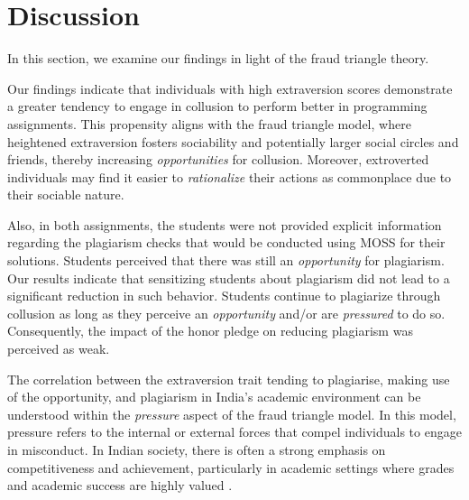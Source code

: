 \section{Discussion} \label{sec:discuss}

In this section, we examine our findings in light of the fraud triangle theory.

Our findings indicate that individuals with high extraversion scores demonstrate a greater tendency to engage in collusion to perform better in programming assignments. This propensity aligns with the fraud triangle model, where heightened extraversion fosters sociability and potentially larger social circles and friends, thereby increasing \emph{opportunities} for collusion. Moreover, extroverted individuals may find it easier to \emph{rationalize} their actions as commonplace due to their sociable nature.

Also, in both assignments, the students were not provided explicit information regarding the plagiarism checks that would be conducted using MOSS for their solutions. Students perceived that there was still an \emph{opportunity} for plagiarism. Our results indicate that sensitizing students about plagiarism did not lead to a significant reduction in such behavior. Students continue to plagiarize through collusion as long as they perceive an \textit{opportunity} and/or are \textit{pressured} to do so. Consequently, the impact of the honor pledge on reducing plagiarism was perceived as weak.

The correlation between the extraversion trait tending to plagiarise, making use of the opportunity, and plagiarism in India's academic environment can be understood within the \textit{pressure} aspect of the fraud triangle model. In this model, pressure refers to the internal or external forces that compel individuals to engage in misconduct. In Indian society, there is often a strong emphasis on competitiveness and achievement, particularly in academic settings where grades and academic success are highly valued \cite{IITPrepMenace,UnemploymentIndia, NAIR2020831}. %


